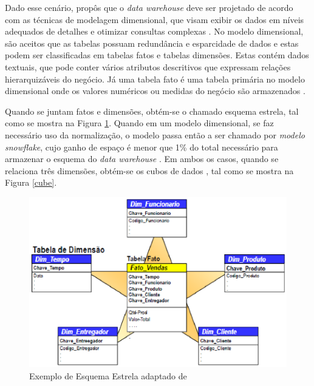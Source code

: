 Dado esse cenário,  propôs que o \textit{data warehouse} deve ser projetado de acordo com as técnicas de modelagem dimensional, que visam exibir os dados em níveis adequados de detalhes e otimizar consultas complexas \cite{valeria2012}. No modelo dimensional, são aceitos que as tabelas possuam redundância e esparcidade de dados e estas podem ser classificadas em tabelas fatos e tabelas dimensões. Estas contém dados textuais, que pode conter vários atributos descritivos que expressam relações hierarquizáveis do negócio. Já uma tabela fato é uma tabela primária no modelo dimensional onde os valores numéricos ou medidas do negócio são armazenados \cite{Kimball2002}. 


Quando se juntam fatos e dimensões, obtém-se o chamado esquema estrela, tal como se mostra na Figura \ref{estrela}. Quando em um modelo dimensional, se faz necessário uso da normalização, o modelo passa então a ser chamado por \textit{modelo snowflake}, cujo ganho de espaço é menor que 1\% do total necessário para armazenar o esquema do \textit{data warehouse} . Em ambos os casos, quando se relaciona três dimensões, obtém-se os cubos de dados \cite{Kimball2002}, tal como se mostra na Figura \ref{cube}.


\begin{figure}[ht!]
\centering
\includegraphics[keepaspectratio=true,scale=0.2]{figuras/star_schema.eps}
\caption{Exemplo de Esquema Estrela adaptado de }
\label{estrela}
\end{figure}
\FloatBarrier


